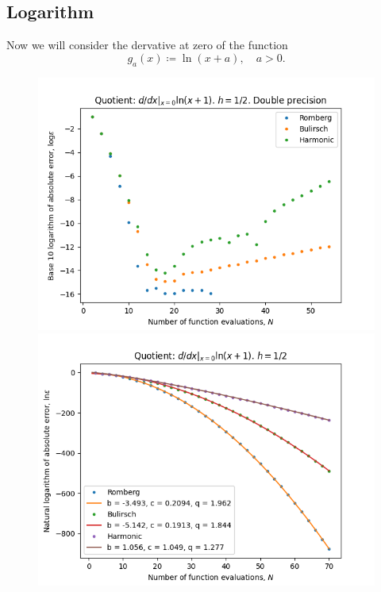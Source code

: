 \subsection{Logarithm}

Now we will consider the dervative at zero of the function 
\[
g_a(x) \coloneqq \ln(x+a), \quad a > 0.
\]

\begin{figure}[H]
\centering
\begin{minipage}{0.45\textwidth}
\centering
\includegraphics[scale=0.45]{diff_quot_plots/h_one.png}
\end{minipage}
\begin{minipage}{0.45\textwidth}
\centering
\includegraphics[scale=0.45]{diff_quot_plots/h_one_hp_trend.png}
\end{minipage}
\end{figure}

